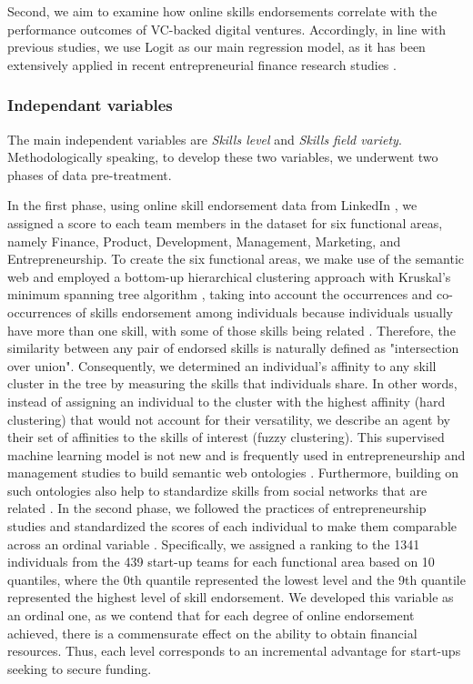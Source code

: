 \documentclass[12pt]{article}
\begin{document}
Second, we aim to examine how online skills endorsements correlate with the performance outcomes of VC-backed digital ventures. Accordingly, in line with previous studies, we use Logit as our main regression model, as it has been extensively applied in recent entrepreneurial finance research studies \citep{ahlers2015signaling, islam2018signaling}.

\subsubsection{Independant variables}

The main independent variables are \textit{Skills level} and \textit{Skills field variety}. Methodologically speaking, to develop these two variables, we underwent two phases of data pre-treatment.

In the first phase, using online skill endorsement data from LinkedIn \citep{rapanta2017linkedin}, we assigned a score to each team members in the dataset for six functional areas, namely Finance, Product, Development, Management, Marketing, and Entrepreneurship. To create the six functional areas, we make use of the semantic web and employed a bottom-up hierarchical clustering approach with Kruskal's minimum spanning tree algorithm \citep{kruskal1956shortest}, taking into account the occurrences and co-occurrences of skills endorsement among individuals because individuals usually have more than one skill, with some of those skills being related \citep{perez2016endorsement}. Therefore, the similarity between any pair of endorsed skills is naturally defined as "intersection over union". Consequently, we determined an individual's affinity to any skill cluster in the tree by measuring the skills that individuals share. In other words, instead of assigning an individual to the cluster with the highest affinity (hard clustering) that would not account for their versatility, we describe an agent by their set of affinities to the skills of interest (fuzzy clustering). This supervised machine learning model is not new and is frequently used in entrepreneurship and management studies to build semantic web ontologies \citep{kaushal2021artificial, ponte2022use}. Furthermore, building on such ontologies also help to standardize skills from social networks that are related  \citep{perez2016endorsement}. In the second phase, we followed the practices of entrepreneurship studies and standardized the scores of each individual to make them comparable across an ordinal variable \citep{harrison2007s}. Specifically, we assigned a ranking to the 1341 individuals from the 439 start-up teams for each functional area based on 10 quantiles, where the 0th quantile represented the lowest level and the 9th quantile represented the highest level of skill endorsement. We developed this variable as an ordinal one, as we contend that for each degree of online endorsement achieved, there is a commensurate effect on the ability to obtain financial resources. Thus, each level corresponds to an incremental advantage for start-ups seeking to secure funding.
\end{document}
